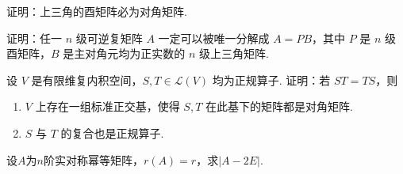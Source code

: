 \begin{exercise}

    \begin{exgroup}
        \item 证明：上三角的酉矩阵必为对角矩阵.

        \item 证明：任一 $ n $ 级可逆复矩阵 $ A $ 一定可以被唯一分解成 $ A = PB $，其中 $ P $ 是 $ n $ 级酉矩阵，$ B $ 是主对角元均为正实数的 $ n $ 级上三角矩阵.
    \end{exgroup}

    \begin{exgroup}
        \item 设 $ V $ 是有限维复内积空间，$ S, T \in \mathcal{L}(V) $ 均为正规算子. 证明：若 $ ST = TS $，则
        \begin{enumerate}
            \item $ V $ 上存在一组标准正交基，使得 $ S, T $ 在此基下的矩阵都是对角矩阵.

            \item $ S $ 与 $ T $ 的复合也是正规算子.
        \end{enumerate}

        \item 设$A$为$n$阶实对称幂等矩阵，$r(A)=r$，求$|A-2E|$.
    \end{exgroup}


\end{exercise}
